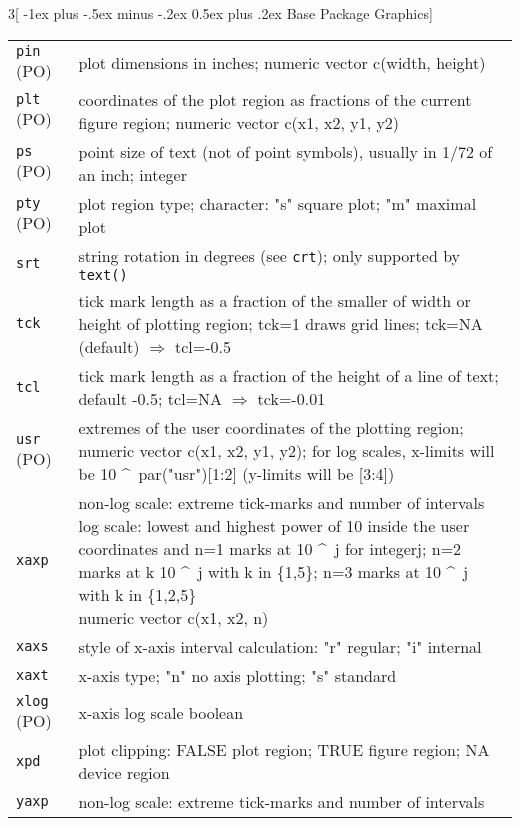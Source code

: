 \documentclass[landscape]{article}
\makeatletter
\renewcommand{\section}{\@startsection{section}{1}{0mm}%
                                {-1ex plus -.5ex minus -.2ex}%
                                {0.5ex plus .2ex}%
                                {\normalfont\large\bfseries}}
\makeatother
\begin{document}
\begin{multicols}{3}[\section{Base Package Graphics}]
\begin{tabular}[t]{@{}p{\widthleftcol}p{\widthrightcol}@{}}
\hline
\verb|pin| (PO) & plot dimensions in inches; numeric vector c(width, height) \\
\verb|plt| (PO) & coordinates of the plot region as fractions of the current figure region; numeric vector c(x1, x2, y1, y2) \\
\verb|ps| (PO) & point size of text (not of point symbols), usually in 1/72 of an inch; integer \\
\verb|pty| (PO) & plot region type; character: "s" square plot; "m" maximal plot \\
\verb|srt| & string rotation in degrees (see \verb|crt|); only supported by \verb|text()| \\
\verb|tck| & tick mark length as a fraction of the smaller of width or height of plotting region; tck=1 draws grid lines; tck=NA (default) $\Rightarrow$ tcl=-0.5 \\
\verb|tcl| & tick mark length as a fraction of the height of a line of text; default -0.5; tcl=NA $\Rightarrow$ tck=-0.01 \\
\verb|usr| (PO) & extremes of the user coordinates of the plotting region; numeric vector c(x1, x2, y1, y2); for log scales, x-limits will be 10 \textasciicircum \ par("usr")[1:2] (y-limits will be [3:4]) \\
\verb|xaxp| & \parbox[t]{\widthrightcol}{
non-log scale: extreme tick-marks and number of intervals \\
log scale: lowest and highest power of 10 inside the user coordinates and n=1 marks at 10 \textasciicircum \ j for integerj; n=2 marks at k 10 \textasciicircum \ j with k in \{1,5\}; n=3 marks at 10 \textasciicircum \ j with k in \{1,2,5\} \\
numeric vector c(x1, x2, n)
} \\
\verb|xaxs| & style of x-axis interval calculation: "r" regular; "i" internal \\
\verb|xaxt| & x-axis type; "n" no axis plotting; "s" standard \\
\verb|xlog| (PO) & x-axis log scale boolean \\
\verb|xpd| & plot clipping: FALSE plot region; TRUE figure region; NA device region \\
\verb|yaxp| & \parbox[t]{\widthrightcol}{
non-log scale: extreme tick-marks and number of intervals \\
}
\end{tabular}
\end{multicols}
\end{document}
